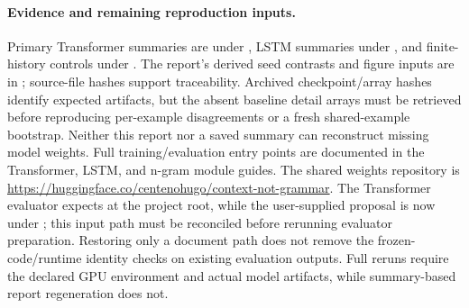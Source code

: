 \documentclass[10pt]{article}
\begin{document}
\paragraph{Evidence and remaining reproduction inputs.}
Primary Transformer summaries are under , LSTM summaries under , and finite-history controls under . The report's derived seed contrasts and figure inputs are in ; source-file hashes support traceability. Archived checkpoint/array hashes identify expected artifacts, but the absent baseline detail arrays must be retrieved before reproducing per-example disagreements or a fresh shared-example bootstrap. Neither this report nor a saved summary can reconstruct missing model weights. Full training/evaluation entry points are documented in the Transformer, LSTM, and n-gram module guides. The shared weights repository is \url{https://huggingface.co/centenohugo/context-not-grammar}. The Transformer evaluator expects  at the project root, while the user-supplied proposal is now under ; this input path must be reconciled before rerunning evaluator preparation. Restoring only a document path does not remove the frozen-code/runtime identity checks on existing evaluation outputs. Full reruns require the declared GPU environment and actual model artifacts, while summary-based report regeneration does not.
\end{document}
